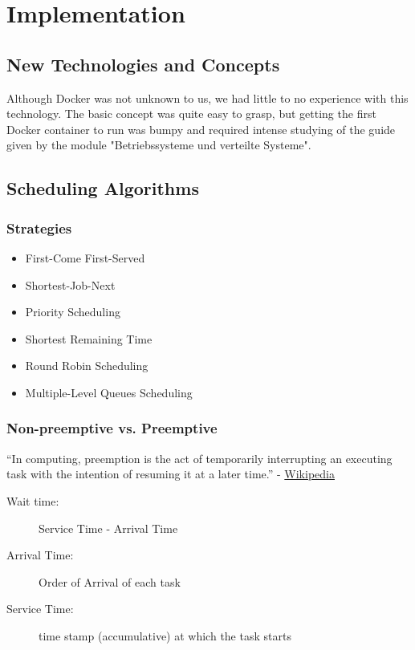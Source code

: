 \documentclass{article}
\begin{document}
\section{Implementation}
\subsection{New Technologies and Concepts}
Although Docker was not unknown to us, we had little to no experience with this technology. The basic concept was quite easy to grasp, but getting the first Docker container to run was bumpy and required intense studying of the guide given by the module "Betriebssysteme und verteilte Systeme".

\subsection{Scheduling Algorithms}
\subsubsection{Strategies}
\begin{itemize}
    \item First-Come First-Served
    \item Shortest-Job-Next
    \item Priority Scheduling
    \item Shortest Remaining Time
    \item Round Robin Scheduling
    \item Multiple-Level Queues Scheduling
\end{itemize}

\subsubsection{Non-preemptive vs. Preemptive}
``In computing, preemption is the act of temporarily interrupting an executing task with the intention of resuming it at a later time.'' - \href{https://en.wikipedia.org/wiki/Preemption_(computing)}{Wikipedia}

\begin{description}
    \item[Wait time:] Service Time - Arrival Time
    \item[Arrival Time:] Order of Arrival of each task
    \item[Service Time:] time stamp (accumulative) at which the task starts
\end{description}
\end{document}
